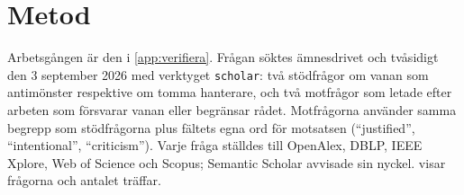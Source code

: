 \section{Metod}
\label{sec:ca-metod}

Arbetsgången är den i \cref{app:verifiera}.  Frågan söktes ämnesdrivet
och tvåsidigt den 3 september 2026 med verktyget \texttt{scholar}: två
stödfrågor om vanan som antimönster respektive om tomma hanterare, och
två motfrågor som letade efter arbeten som försvarar vanan eller
begränsar rådet.  Motfrågorna använder samma begrepp som stödfrågorna
plus fältets egna ord för motsatsen (\enquote{justified},
\enquote{intentional}, \enquote{criticism}).  Varje fråga ställdes till
OpenAlex, DBLP, IEEE Xplore, Web of Science och Scopus; Semantic Scholar
avvisade sin nyckel.   visar frågorna och antalet
träffar.

